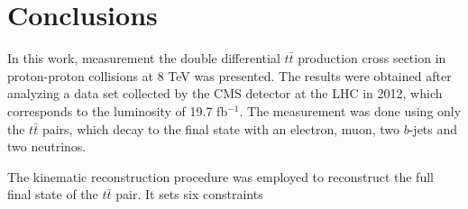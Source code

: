 \chapter{Conclusions}\label{chapt:conc}

In this work, measurement the double differential $t\bar{t}$ production cross section in proton-proton collisions at 8 TeV was presented.
The results were obtained after analyzing a data set collected by the CMS detector at the LHC in 2012, which corresponds to the 
luminosity of 19.7 fb$^{-1}$. The measurement was done using only the $t\bar{t}$ pairs, which decay to the final state with an
electron, muon, two $b$-jets and two neutrinos.

The kinematic reconstruction procedure was employed to reconstruct the full final state of the $t\bar{t}$ pair. It sets six constraints 


